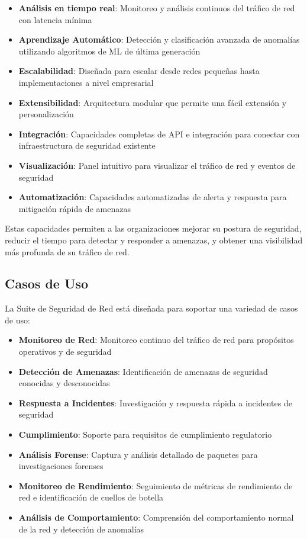 \begin{itemize}
    \item \textbf{Análisis en tiempo real}: Monitoreo y análisis continuos del tráfico de red con latencia mínima
    \item \textbf{Aprendizaje Automático}: Detección y clasificación avanzada de anomalías utilizando algoritmos de ML de última generación
    \item \textbf{Escalabilidad}: Diseñada para escalar desde redes pequeñas hasta implementaciones a nivel empresarial
    \item \textbf{Extensibilidad}: Arquitectura modular que permite una fácil extensión y personalización
    \item \textbf{Integración}: Capacidades completas de API e integración para conectar con infraestructura de seguridad existente
    \item \textbf{Visualización}: Panel intuitivo para visualizar el tráfico de red y eventos de seguridad
    \item \textbf{Automatización}: Capacidades automatizadas de alerta y respuesta para mitigación rápida de amenazas
\end{itemize}

Estas capacidades permiten a las organizaciones mejorar su postura de seguridad, reducir el tiempo para detectar y responder a amenazas, y obtener una visibilidad más profunda de su tráfico de red.

\subsection{Casos de Uso}
La Suite de Seguridad de Red está diseñada para soportar una variedad de casos de uso:

\begin{itemize}
    \item \textbf{Monitoreo de Red}: Monitoreo continuo del tráfico de red para propósitos operativos y de seguridad
    \item \textbf{Detección de Amenazas}: Identificación de amenazas de seguridad conocidas y desconocidas
    \item \textbf{Respuesta a Incidentes}: Investigación y respuesta rápida a incidentes de seguridad
    \item \textbf{Cumplimiento}: Soporte para requisitos de cumplimiento regulatorio
    \item \textbf{Análisis Forense}: Captura y análisis detallado de paquetes para investigaciones forenses
    \item \textbf{Monitoreo de Rendimiento}: Seguimiento de métricas de rendimiento de red e identificación de cuellos de botella
    \item \textbf{Análisis de Comportamiento}: Comprensión del comportamiento normal de la red y detección de anomalías
\end{itemize}

